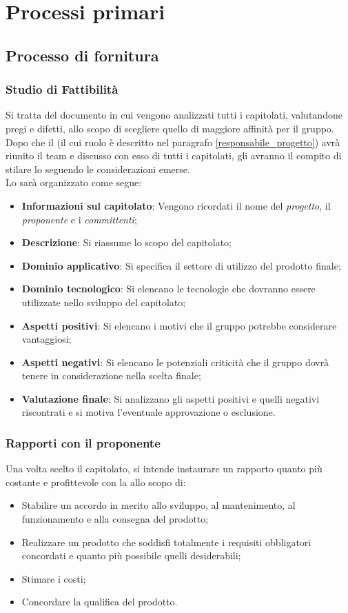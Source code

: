 \newpage
\section{Processi primari}
\subsection{Processo di fornitura}

\subsubsection{Studio di Fattibilità}
Si tratta del documento in cui vengono analizzati tutti i capitolati, valutandone pregi e difetti, allo scopo di scegliere quello di maggiore affinità per il gruppo.
Dopo che il \RdP{} (il cui ruolo è descritto nel paragrafo \ref{responsabile_progetto}) avrà riunito il team e discusso con esso di tutti i capitolati, gli \anas{} avranno il compito di stilare lo \SdF{} seguendo le considerazioni emerse.\\
Lo \SdF{} sarà organizzato come segue:
\begin{itemize}
	\item \textbf{Informazioni sul capitolato}:
	Vengono ricordati il nome del \emph{progetto}, il \textit{proponente} e i \textit{committenti};
	\item \textbf{Descrizione}:
	Si riassume lo scopo del capitolato;
	\item \textbf{Dominio applicativo}:
	Si specifica il settore di utilizzo del prodotto finale;
	\item \textbf{Dominio tecnologico}:
	Si elencano le tecnologie che dovranno essere utilizzate nello sviluppo del capitolato;
	\item \textbf{Aspetti positivi}:
	Si elencano i motivi che il gruppo potrebbe considerare vantaggiosi;
	\item \textbf{Aspetti negativi}:
	Si elencano le potenziali criticità che il gruppo dovrà tenere in considerazione nella scelta finale;
	\item \textbf{Valutazione finale}:
	Si analizzano gli aspetti positivi e quelli negativi riscontrati e si motiva l'eventuale approvazione o esclusione.
\end{itemize}

\subsubsection{Rapporti con il proponente}
Una volta scelto il capitolato, si intende instaurare un rapporto quanto più costante e profittevole con la \proponente{} allo scopo di:
\begin{itemize}
	\item Stabilire un accordo in merito allo sviluppo, al mantenimento, al funzionamento e alla consegna del prodotto;
	\item Realizzare un prodotto che soddisfi totalmente i requisiti obbligatori concordati e quanto più possibile quelli desiderabili;
	\item Stimare i costi;
	\item Concordare la qualifica del prodotto.
\end{itemize}

